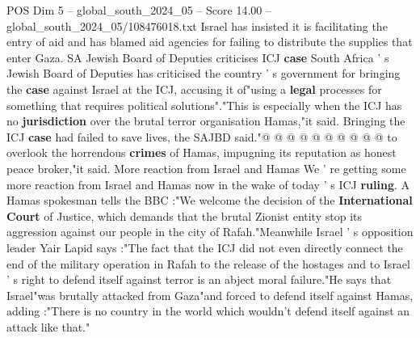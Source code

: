 \begin{textsample}{POS Dim 5 – global\_south\_2024\_05 – Score 14.00 – global\_south\_2024\_05/108476018.txt}
Israel has insisted it is facilitating the entry of aid and has blamed aid agencies for failing to distribute the supplies that enter Gaza.
SA Jewish Board of Deputies criticises ICJ \textbf{case} South Africa ' s Jewish Board of Deputies has criticised the country ' s government for bringing the \textbf{case} against Israel at the ICJ, accusing it of"using a \textbf{legal} processes for something that requires political solutions"."This is especially when the ICJ has no \textbf{jurisdiction} over the brutal terror organisation Hamas,"it said.
Bringing the ICJ \textbf{case} had failed to save lives, the SAJBD said."@ @ @ @ @ @ @ @ @ @ to overlook the horrendous \textbf{crimes} of Hamas, impugning its reputation as honest peace broker,"it said.
More reaction from Israel and Hamas We ' re getting some more reaction from Israel and Hamas now in the wake of today ' s ICJ \textbf{ruling}.
A Hamas spokesman tells the BBC :"We welcome the decision of the \textbf{International} \textbf{Court} of Justice, which demands that the brutal Zionist entity stop its aggression against our people in the city of Rafah."Meanwhile Israel ' s opposition leader Yair Lapid says :"The fact that the ICJ did not even directly connect the end of the military operation in Rafah to the release of the hostages and to Israel ' s right to defend itself against terror is an abject moral failure."He says that Israel"was brutally attacked from Gaza"and forced to defend itself against Hamas, adding :"There is no country in the world which wouldn't defend itself against an attack like that."

\end{textsample}
